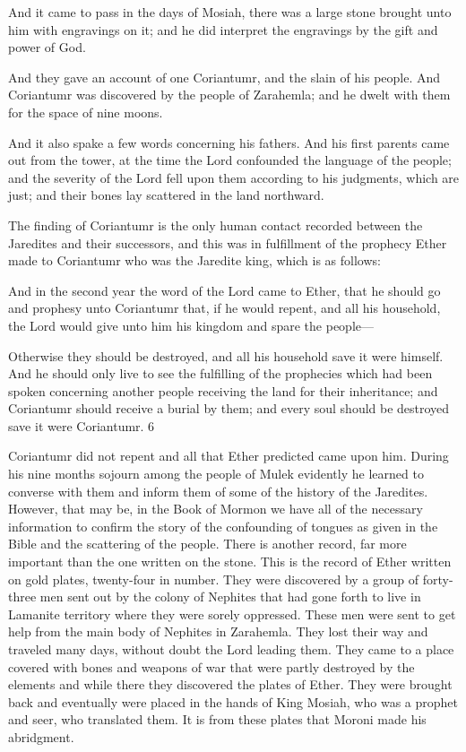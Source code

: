 And it came to pass in the days of Mosiah, there was a large stone brought unto him with
engravings on it; and he did interpret the engravings by the gift and power of God.

And they gave an account of one Coriantumr, and the slain of his people. And Coriantumr
was discovered by the people of Zarahemla; and he dwelt with them for the space of nine
moons.

And it also spake a few words concerning his fathers. And his first parents came out from the
tower, at the time the Lord confounded the language of the people; and the severity of the
Lord fell upon them according to his judgments, which are just; and their bones lay scattered
in the land northward.

The finding of Coriantumr is the only human contact recorded between the Jaredites and their
successors, and this was in fulfillment of the prophecy Ether made to Coriantumr who was
the Jaredite king, which is as follows:

And in the second year the word of the Lord came to Ether, that he should go and prophesy
unto Coriantumr that, if he would repent, and all his household, the Lord would give unto
him his kingdom and spare the people—

Otherwise they should be destroyed, and all his household save it were himself. And he
should only live to see the fulfilling of the prophecies which had been spoken concerning
another people receiving the land for their inheritance; and Coriantumr should receive a
burial by them; and every soul should be destroyed save it were Coriantumr. 6

Coriantumr did not repent and all that Ether predicted came upon him. During his nine
months sojourn among the people of Mulek evidently he learned to converse with them and
inform them of some of the history of the Jaredites. However, that may be, in the Book of
Mormon we have all of the necessary information to confirm the story of the confounding of
tongues as given in the Bible and the scattering of the people. There is another record, far
more important than the one written on the stone. This is the record of Ether written on gold
plates, twenty-four in number. They were discovered by a group of forty-three men sent out
by the colony of Nephites that had gone forth to live in Lamanite territory where they were
sorely oppressed. These men were sent to get help from the main body of Nephites in
Zarahemla. They lost their way and traveled many days, without doubt the Lord leading
them. They came to a place covered with bones and weapons of war that were partly
destroyed by the elements and while there they discovered the plates of Ether. They were
brought back and eventually were placed in the hands of King Mosiah, who was a prophet
and seer, who translated them. It is from these plates that Moroni made his abridgment.

